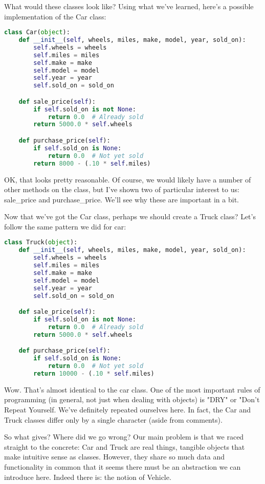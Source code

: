 What would these classes look like? Using what we've learned, here's a possible implementation of the Car class:

\begin{lstlisting}[language=Python]
class Car(object):
    def __init__(self, wheels, miles, make, model, year, sold_on):
        self.wheels = wheels
        self.miles = miles
        self.make = make
        self.model = model
        self.year = year
        self.sold_on = sold_on

    def sale_price(self):
        if self.sold_on is not None:
            return 0.0  # Already sold
        return 5000.0 * self.wheels

    def purchase_price(self):
        if self.sold_on is None:
            return 0.0  # Not yet sold
        return 8000 - (.10 * self.miles)
\end{lstlisting}

OK, that looks pretty reasonable. Of course, we would likely have a number of other methods on the class, but I've shown two of particular interest to us: sale_price and purchase_price. We'll see why these are important in a bit.

Now that we've got the Car class, perhaps we should create a Truck class? Let's follow the same pattern we did for car:

\begin{lstlisting}[language=Python]
class Truck(object):
    def __init__(self, wheels, miles, make, model, year, sold_on):
        self.wheels = wheels
        self.miles = miles
        self.make = make
        self.model = model
        self.year = year
        self.sold_on = sold_on

    def sale_price(self):
        if self.sold_on is not None:
            return 0.0  # Already sold
        return 5000.0 * self.wheels

    def purchase_price(self):
        if self.sold_on is None:
            return 0.0  # Not yet sold
        return 10000 - (.10 * self.miles)
\end{lstlisting}

Wow. That's almost identical to the car class. One of the most important rules of programming (in general, not just when dealing with objects) is "DRY" or "Don't Repeat Yourself. We've definitely repeated ourselves here. In fact, the Car and Truck classes differ only by a single character (aside from comments).

So what gives? Where did we go wrong? Our main problem is that we raced straight to the concrete: Car and Truck are real things, tangible objects that make intuitive sense as classes. However, they share so much data and functionality in common that it seems there must be an abstraction we can introduce here. Indeed there is: the notion of Vehicle.

